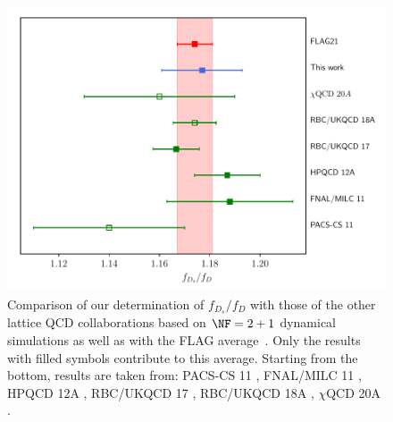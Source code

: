 \begin{figure}[!h]
	\centering
	\includegraphics[scale=0.7]{./cap6/figs/fds/ratio_fds_comparison.pdf}
	\caption{Comparison of our determination of $f_{D_s}/f_D$ with those of the other lattice QCD collaborations based on $\NF=2+1$ dynamical simulations as well as with the FLAG average~\cite{FlavourLatticeAveragingGroupFLAG:2021npn}. Only the results with filled symbols contribute to this average. Starting from the bottom, results are taken from:  PACS-CS 11 \cite{PACS-CS:2011ngu}, FNAL/MILC 11  \cite{FermilabLattice:2011njy}, HPQCD 12A \cite{Na:2012iu},  RBC/UKQCD 17 \cite{Boyle:2017jwu}, RBC/UKQCD 18A \cite{Boyle:2018knm},  $\chi$QCD 20A \cite{Chen:2020qma}. }
	\label{fig:fds_over_fd_comparison}
\end{figure}





